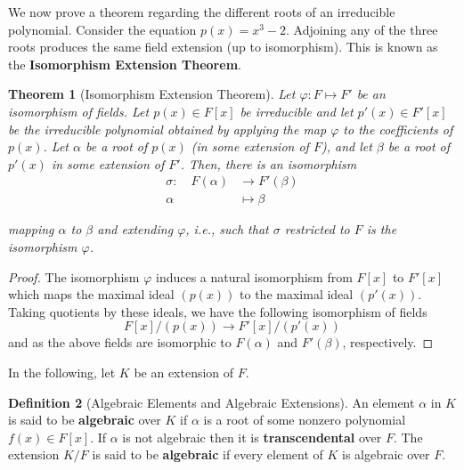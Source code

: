 \documentclass[10pt, oneside, reqno]{amsart}
\theoremstyle{plain}%
\newtheorem{thm}{Theorem}[section]
\theoremstyle{definition}
\newtheorem{defn}[thm]{Definition}
\theoremstyle{remark}
\newcommand{\mapping}[5]{\begin{align*}
    #1 : \quad     #2 &\rightarrow #3 \\
            #4  &\mapsto #5
\end{align*}    
}
\begin{document}
We now prove a theorem regarding the different roots of an irreducible polynomial.  Consider the equation $p(x) = x^3 - 2$.  Adjoining any of the three roots produces the same field extension (up to isomorphism).    This is known as the \textbf{Isomorphism Extension Theorem}.   

\begin{thm}[Isomorphism Extension Theorem]
    Let $\varphi : F \mapsto F'$ be an isomorphism of fields.  Let $p(x) \in F[x]$ be irreducible and let $p'(x) \in F'[x]$ be the irreducible polynomial obtained by applying the map $\varphi$ to the coefficients of $p(x)$.  Let $\alpha$ be a root of $p(x)$ (in some extension of $F$), and let $\beta$ be a root of $p'(x)$ in some extension of $F'$.  Then, there is an isomorphism
    \mapping{\sigma}{F(\alpha)}{F'(\beta)}{\alpha}{\beta}
    mapping $\alpha$ to $\beta$ and extending $\varphi$, i.e., such that $\sigma$ restricted to $F$ is the isomorphism $\varphi$.
\end{thm}
\begin{proof}
    The isomorphism $\varphi$ induces a natural isomorphism from $F[x]$ to $F'[x]$ which maps the maximal ideal $(p(x))$ to the maximal ideal $(p'(x))$.  Taking quotients by these ideals, we have the following isomorphism of fields\[
        F[x]/(p(x)) \rightarrow F'[x]/(p'(x))
    \]
    and as the above fields are isomorphic to $F(\alpha)$ and $F'(\beta)$, respectively.
\end{proof}

In the following, let $K$ be an extension of $F$.
\begin{defn}[Algebraic Elements and Algebraic Extensions]
    An element $\alpha$ in $K$ is said to be \textbf{algebraic} over $K$ if $\alpha$ is a root of some nonzero polynomial $f(x) \in F[x]$.  If $\alpha$ is not algebraic then it is \textbf{transcendental} over $F$.  The extension $K/F$ is said to be \textbf{algebraic} if every element of $K$ is algebraic over $F$.
\end{defn}
\end{document}
